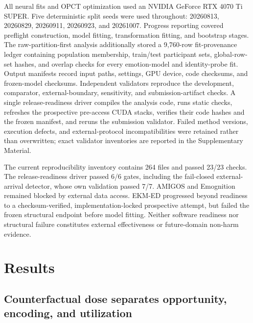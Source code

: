 \documentclass[preprint,12pt]{elsarticle}
\begin{document}
All neural fits and OPCT optimization used an NVIDIA GeForce RTX 4070 Ti SUPER. Five deterministic split seeds were used throughout: 20260813, 20260829, 20260911, 20260923, and 20261007. Progress reporting covered preflight construction, model fitting, transformation fitting, and bootstrap stages. The raw-partition-first analysis additionally stored a 9,760-row fit-provenance ledger containing population membership, train/test participant sets, global-row-set hashes, and overlap checks for every emotion-model and identity-probe fit. Output manifests record input paths, settings, GPU device, code checksums, and frozen-model checksums. Independent validators reproduce the development, comparator, external-boundary, sensitivity, and submission-artifact checks. A single release-readiness driver compiles the analysis code, runs static checks, refreshes the prospective pre-access CUDA stacks, verifies their code hashes and the frozen manifest, and reruns the submission validator. Failed method versions, execution defects, and external-protocol incompatibilities were retained rather than overwritten; exact validator inventories are reported in the Supplementary Material.

The current reproducibility inventory contains 264 files and passed 23/23 checks. The release-readiness driver passed 6/6 gates, including the fail-closed external-arrival detector, whose own validation passed 7/7. AMIGOS and Emognition remained blocked by external data access. EKM-ED progressed beyond readiness to a checksum-verified, implementation-locked prospective attempt, but failed the frozen structural endpoint before model fitting. Neither software readiness nor structural failure constitutes external effectiveness or future-domain non-harm evidence.

\section{Results}
\label{sec:results}

\subsection{Counterfactual dose separates opportunity, encoding, and utilization}
\end{document}

